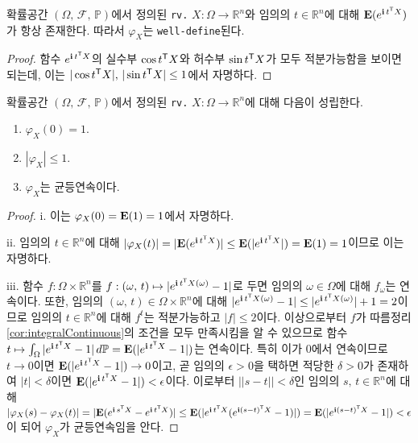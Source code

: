 \begin{proposition}
    확률공간 $(\Omega,\,\mathcal{F},\,\mathbb{P})$에서 정의된 \texttt{rv.} $X:\Omega\to\mathbb{R}^n$와 임의의 $t\in\mathbb{R}^n$에 대해 $\mathbf{E}(e^{\mathbf{i}\,t^{\mathsf{T}} X})$가 항상 존재한다. 따라서 $\varphi_X$는 \texttt{well-define}된다.
\end{proposition}

\begin{proof}
    함수 $e^{\mathbf{i}\,t^{\mathsf{T}} X}$의 실수부 $\cos t^{\mathsf{T}} X$와 허수부 $\sin t^{\mathsf{T}} X$가 모두 적분가능함을 보이면 되는데, 이는 $|\cos t^{\mathsf{T}} X|,\,|\sin t^{\mathsf{T}} X|\leq1$에서 자명하다.
\end{proof}

\begin{theorem}
    확률공간 $(\Omega,\,\mathcal{F},\,\mathbb{P})$에서 정의된 \texttt{rv.} $X:\Omega\to\mathbb{R}^n$에 대해 다음이 성립한다.
    \begin{enumerate}
        \item $\varphi_X(0)=1$.
        \item $|\varphi_X|\leq1$.
        \item $\varphi_X$는 균등연속이다.
    \end{enumerate}
\end{theorem}

\begin{proof}
    i. 이는 $\varphi_X(0)=\mathbf{E}(1)=1$에서 자명하다.

    ii. 임의의 $t\in\mathbb{R}^n$에 대해 $|\varphi_X(t)|=|\mathbf{E}(e^{\mathbf{i}\,t^{\mathsf{T}} X})|\leq\mathbf{E}(|e^{\mathbf{i}\,t^{\mathsf{T}} X}|)=\mathbf{E}(1)=1$이므로 이는 자명하다.

    iii. 함수 $f:\Omega\times\mathbb{R}^n$를 $f:(\omega,\,t)\mapsto|e^{\mathbf{i}\,t^{\mathsf{T}} X(\omega)}-1|$로 두면 임의의 $\omega\in\Omega$에 대해 $f_\omega$는 연속이다. 또한, 임의의 $(\omega,\,t)\in\Omega\times\mathbb{R}^n$에 대해 $|e^{\mathbf{i}\,t^{\mathsf{T}} X(\omega)}-1|\leq|e^{\mathbf{i}\,t^{\mathsf{T}} X(\omega)}|+1=2$이므로 임의의 $t\in\mathbb{R}^n$에 대해 $f^t$는 적분가능하고 $|f|\leq2$이다. 이상으로부터 $f$가 따름정리 \ref{cor:integralContinuous}의 조건을 모두 만족시킴을 알 수 있으므로 함수 $t\mapsto\int_\Omega|e^{\mathbf{i}\,t^{\mathsf{T}} X}-1|\,d\mathbb{P}=\mathbf{E}(|e^{\mathbf{i}\,t^{\mathsf{T}} X}-1|)$는 연속이다. 특히 이가 $0$에서 연속이므로 $t\to0$이면 $\mathbf{E}(|e^{\mathbf{i}\,t^{\mathsf{T}} X}-1|)\to0$이고, 곧 임의의 $\epsilon>0$을 택하면 적당한 $\delta>0$가 존재하여 $|t|<\delta$이면 $\mathbf{E}(|e^{\mathbf{i}\,t^{\mathsf{T}} X}-1|)<\epsilon$이다. 이로부터 $||s-t||<\delta$인 임의의 $s,\,t\in\mathbb{R}^n$에 대해 $|\varphi_X(s)-\varphi_X(t)|=|\mathbf{E}(e^{\mathbf{i}\,s^{\mathsf{T}} X}-e^{\mathbf{i}\,t^{\mathsf{T}} X})|\leq\mathbf{E}(|e^{\mathbf{i}\,t^{\mathsf{T}} X}(e^{\mathbf{i}(s-t)^{\mathsf{T}} X}-1)|)=\mathbf{E}(|e^{\mathbf{i}(s-t)^{\mathsf{T}} X}-1|)<\epsilon$이 되어 $\varphi_X$가 균등연속임을 안다.
\end{proof}

